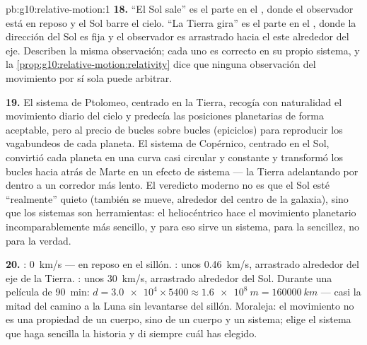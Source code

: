 \begin{solution}{pb:g10:relative-motion:1}
\textbf{18.} ``El Sol sale'' es el parte en el , donde
el observador está en reposo y el Sol barre el cielo. ``La Tierra gira''
es el parte en el , donde la dirección del Sol es
fija y el observador es arrastrado hacia el este alrededor del eje.
Describen la misma observación; cada uno es correcto en su propio
sistema, y la \cref{prop:g10:relative-motion:relativity} dice que
ninguna observación del movimiento por sí sola puede arbitrar.

\textbf{19.} El sistema de Ptolomeo, centrado en la Tierra, recogía con
naturalidad el movimiento diario del cielo y predecía las posiciones
planetarias de forma aceptable, pero al precio de bucles sobre bucles
(epiciclos) para reproducir los vagabundeos de cada planeta. El sistema
de Copérnico, centrado en el Sol, convirtió cada planeta en una curva
casi circular y constante y transformó los bucles hacia atrás de Marte
en un efecto de sistema --- la Tierra adelantando por dentro a un
corredor más lento. El veredicto moderno no es que el Sol esté
``realmente'' quieto (también se mueve, alrededor del centro de la
galaxia), sino que los sistemas son herramientas: el heliocéntrico hace
el movimiento planetario incomparablemente más sencillo, y para eso
sirve un sistema, para la sencillez, no para la verdad.

\textbf{20.} : \qty{0}{km/s} --- en reposo en el
sillón. : unos \qty{0.46}{km/s}, arrastrado alrededor
del eje de la Tierra. : unos \qty{30}{km/s},
arrastrado alrededor del Sol. Durante una película de \qty{90}{min}:
$d = \num{3.0e4} \times 5400 \approx \qty{1.6e8}{m} = \qty{160000}{km}$
--- casi la mitad del camino a la Luna sin levantarse del sillón.
Moraleja: el movimiento no es una propiedad de un cuerpo, sino de un
cuerpo y un sistema; elige el sistema que haga sencilla la historia y di
siempre cuál has elegido.
\end{solution}

